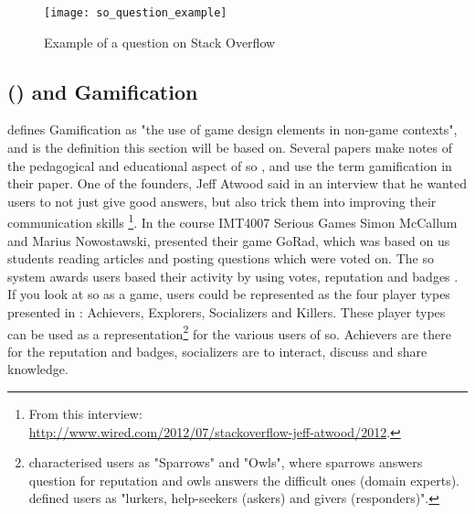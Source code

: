 \begin{figure}[ht]
	\centering
	\texttt{[image: so\_question\_example]}
	\caption[Example of a question on Stack Overflow]{Example of a question on Stack Overflow\footnotemark}
	\label{fig:so_question_example}
\end{figure}

\subsection[Stack Overflow and Gamification]{ () and Gamification}
\label{sec:stackoverflow_gamification}
\textcite{Deterding2011} defines Gamification as "the use of game design elements in non-game contexts", and is the definition this section will be based on. 
Several papers make notes of the pedagogical and educational aspect of \gls{so} \cite{Nasehi2012, Posnett2012, Yang2014}, and \cite{Nasehi2012, Yang2014} use the term gamification in their paper.
One of the founders, Jeff Atwood said in an interview that he wanted users to not just give good answers, but also trick them into improving their communication skills \cite{Posnett2012}\footnote{
	From this interview: \\ 
	\url{http://www.wired.com/2012/07/stackoverflow-jeff-atwood/2012}.
	}.
In the course IMT4007 Serious Games Simon McCallum and Marius Nowostawski, presented their game GoRad, which was based on us students reading articles and posting questions which were voted on. 
The \gls{so} system awards users based their activity by using votes, reputation and badges \cite{M.Sewak2010, Movshovitz-Attias2013, Treude2011, StackOverflow.com2016, StackOverflow.com2016d}.
\vspace{0.5em}\newline
If you look at \gls{so} as a game, users could be represented as the four player types presented in \cite[p.~3]{Maan2013}: Achievers, Explorers, Socializers and Killers. 
These player types can be used as a representation\footnote{	
	\textcite{Yang2014} characterised users as "Sparrows" and "Owls", where sparrows answers question for reputation and owls answers the difficult ones (domain experts).  \\
	\textcite[p.~2]{Ahmed2015} defined users as "lurkers, help-seekers (askers) and givers (responders)".	
	} for the various users of \gls{so}. 
Achievers are there for the reputation and badges, socializers are to interact, discuss and share knowledge. 
